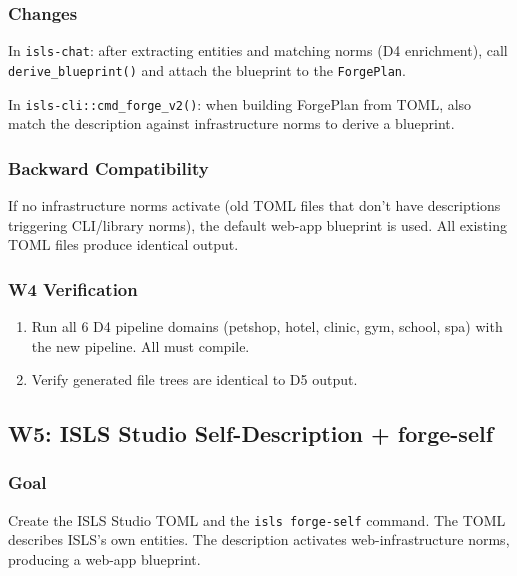 \documentclass[11pt,a4paper]{article}
\begin{document}
\subsubsection{Changes}

In \texttt{isls-chat}: after extracting entities and matching norms
(D4 enrichment), call \texttt{derive\_blueprint()} and attach the
blueprint to the \texttt{ForgePlan}.

In \texttt{isls-cli::cmd\_forge\_v2()}: when building ForgePlan from 
TOML, also match the description against infrastructure norms to 
derive a blueprint.

\subsubsection{Backward Compatibility}

If no infrastructure norms activate (old TOML files that don't have 
descriptions triggering CLI/library norms), the default web-app 
blueprint is used. All existing TOML files produce identical output.

\subsubsection{W4 Verification}

\begin{enumerate}[nosep]
\item Run all 6 D4 pipeline domains (petshop, hotel, clinic, gym, 
      school, spa) with the new pipeline. All must compile.
\item Verify generated file trees are identical to D5 output.
\end{enumerate}


\subsection{W5: ISLS Studio Self-Description + forge-self}
\label{sec:w5}

\subsubsection{Goal}

Create the ISLS Studio TOML and the \texttt{isls forge-self} command.
The TOML describes ISLS's own entities. The description activates
web-infrastructure norms, producing a web-app blueprint.
\end{document}
